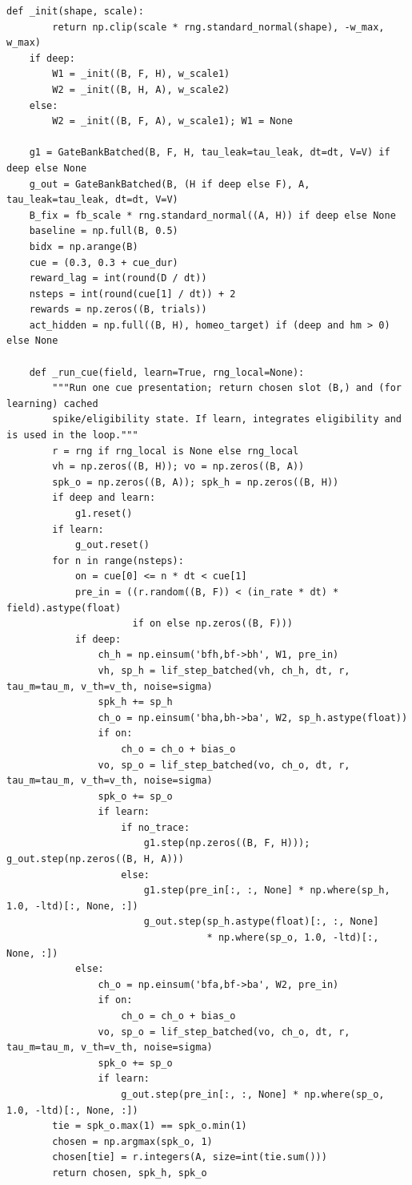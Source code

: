 \begin{lstlisting}[caption={mrl\_trace/probselect.py},label={lst:siox-src-probselect}]
    def _init(shape, scale):
        return np.clip(scale * rng.standard_normal(shape), -w_max, w_max)
    if deep:
        W1 = _init((B, F, H), w_scale1)
        W2 = _init((B, H, A), w_scale2)
    else:
        W2 = _init((B, F, A), w_scale1); W1 = None

    g1 = GateBankBatched(B, F, H, tau_leak=tau_leak, dt=dt, V=V) if deep else None
    g_out = GateBankBatched(B, (H if deep else F), A, tau_leak=tau_leak, dt=dt, V=V)
    B_fix = fb_scale * rng.standard_normal((A, H)) if deep else None
    baseline = np.full(B, 0.5)
    bidx = np.arange(B)
    cue = (0.3, 0.3 + cue_dur)
    reward_lag = int(round(D / dt))
    nsteps = int(round(cue[1] / dt)) + 2
    rewards = np.zeros((B, trials))
    act_hidden = np.full((B, H), homeo_target) if (deep and hm > 0) else None

    def _run_cue(field, learn=True, rng_local=None):
        """Run one cue presentation; return chosen slot (B,) and (for learning) cached
        spike/eligibility state. If learn, integrates eligibility and is used in the loop."""
        r = rng if rng_local is None else rng_local
        vh = np.zeros((B, H)); vo = np.zeros((B, A))
        spk_o = np.zeros((B, A)); spk_h = np.zeros((B, H))
        if deep and learn:
            g1.reset()
        if learn:
            g_out.reset()
        for n in range(nsteps):
            on = cue[0] <= n * dt < cue[1]
            pre_in = ((r.random((B, F)) < (in_rate * dt) * field).astype(float)
                      if on else np.zeros((B, F)))
            if deep:
                ch_h = np.einsum('bfh,bf->bh', W1, pre_in)
                vh, sp_h = lif_step_batched(vh, ch_h, dt, r, tau_m=tau_m, v_th=v_th, noise=sigma)
                spk_h += sp_h
                ch_o = np.einsum('bha,bh->ba', W2, sp_h.astype(float))
                if on:
                    ch_o = ch_o + bias_o
                vo, sp_o = lif_step_batched(vo, ch_o, dt, r, tau_m=tau_m, v_th=v_th, noise=sigma)
                spk_o += sp_o
                if learn:
                    if no_trace:
                        g1.step(np.zeros((B, F, H))); g_out.step(np.zeros((B, H, A)))
                    else:
                        g1.step(pre_in[:, :, None] * np.where(sp_h, 1.0, -ltd)[:, None, :])
                        g_out.step(sp_h.astype(float)[:, :, None]
                                   * np.where(sp_o, 1.0, -ltd)[:, None, :])
            else:
                ch_o = np.einsum('bfa,bf->ba', W2, pre_in)
                if on:
                    ch_o = ch_o + bias_o
                vo, sp_o = lif_step_batched(vo, ch_o, dt, r, tau_m=tau_m, v_th=v_th, noise=sigma)
                spk_o += sp_o
                if learn:
                    g_out.step(pre_in[:, :, None] * np.where(sp_o, 1.0, -ltd)[:, None, :])
        tie = spk_o.max(1) == spk_o.min(1)
        chosen = np.argmax(spk_o, 1)
        chosen[tie] = r.integers(A, size=int(tie.sum()))
        return chosen, spk_h, spk_o


\end{lstlisting}
